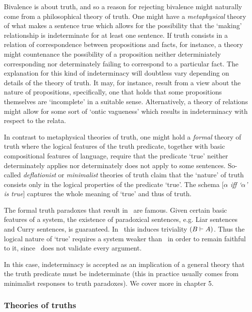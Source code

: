 Bivalence is about truth, and so a reason for rejecting bivalence might naturally come from a philosophical theory of truth. One might have a \emph{metaphysical} theory of what makes a sentence true which allows for the possibility that the `making' relationship is indeterminate for at least one sentence. If truth consists in a relation of correspondence between propositions and facts, for instance, a theory might countenance the possibility of a proposition neither determiniately corresponding nor determinately failing to correspond to a particular fact. The explanation for this kind of indeterminacy will doubtless vary depending on details of the theory of truth. It may, for instance, result from a view about the nature of propositions, specifically, one that holds that some propositions themselves are `incomplete' in a suitable sense. Alternatively, a theory of relations might allow for some sort of `ontic vagueness' which results in indeterminacy with respect to the relata. 
 
In contrast to metaphysical theories of truth, one might hold a \emph{formal} theory of truth where the logical features of the truth predicate, together with basic compositional features of language, require that the predicate `true' neither determinately applies nor determinately does not apply to some sentences. So-called \emph{deflationist} or \emph{minimalist} theories of truth claim that the `nature' of truth consists only in the logical properties of the predicate `true'. The schema [\emph{$\alpha$ iff `$\alpha$' is true}] captures the whole meaning of `true' and thus of truth. 

The formal truth paradoxes that result in \CPL\ are famous. Given certain basic features of a system, the existence of paradoxical sentences, e.g. Liar sentences and Curry sentences, is guaranteed. In \CPL\ this induces triviality $({B}\vdash{A})$. Thus the logical nature of `true' requires a system weaker than \CPL\ in order to remain faithful to it, since \CPL\ does not validate every argument. 

In this case, indeterminacy is accepted as an implication of a general theory that the truth predicate must be indeterminate (this in practice usually comes from minimalist responses to truth paradoxes). We cover more in chapter 5.

\subsubsection{Theories of truths}\label{theoriesOfTruths}

